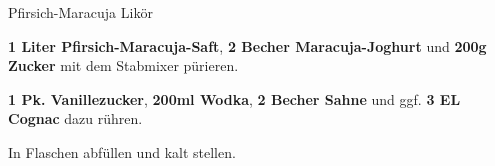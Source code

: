 \begin{recipe}[]{Pfirsich-Maracuja Likör} %

\step
\textbf{1 Liter Pfirsich-Maracuja-Saft}, \textbf{2 Becher Maracuja-Joghurt} und \textbf{200g Zucker} mit dem Stabmixer pürieren.

\step
\textbf{1 Pk. Vanillezucker}, \textbf{200ml Wodka}, \textbf{2 Becher Sahne} und ggf. \textbf{3 EL Cognac} dazu rühren.

\step
In Flaschen abfüllen und kalt stellen.

\end{recipe}
